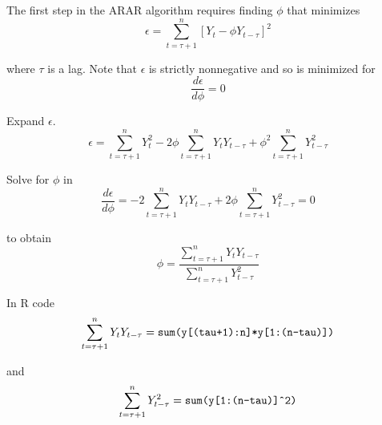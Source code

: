\documentclass[12pt]{article}
\begin{document}
The first step in the ARAR algorithm requires finding $\phi$ that minimizes
\begin{equation*}
\epsilon=\sum_{t=\tau+1}^n[Y_t-\phi Y_{t-\tau}]^2
\end{equation*}

where $\tau$ is a lag.
Note that $\epsilon$ is strictly nonnegative and so is minimized for
\begin{equation*}
\frac{d\epsilon}{d\phi}=0
\end{equation*}

Expand $\epsilon$.
\begin{equation*}
\epsilon=\sum_{t=\tau+1}^nY_t^2-2\phi\sum_{t=\tau+1}^nY_tY_{t-\tau}+\phi^2\sum_{t=\tau+1}^nY_{t-\tau}^2
\end{equation*}

Solve for $\phi$ in
\begin{equation*}
\frac{d\epsilon}{d\phi}=-2\sum_{t=\tau+1}^nY_tY_{t-\tau}+2\phi\sum_{t=\tau+1}^nY_{t-\tau}^2=0
\end{equation*}

to obtain
\begin{equation*}
\phi=\frac{\sum_{t=\tau+1}^nY_tY_{t-\tau}}{\sum_{t=\tau+1}^nY_{t-\tau}^2}
\end{equation*}

In R code
\begin{equation*}
\sum_{t=\tau+1}^nY_tY_{t-\tau}=\text{\tt sum(y[(tau+1):n]*y[1:(n-tau)])}
\end{equation*}

and
\begin{equation*}
\sum_{t=\tau+1}^nY_{t-\tau}^2=\text{\tt sum(y[1:(n-tau)]\^{}2)}
\end{equation*}
\end{document}
